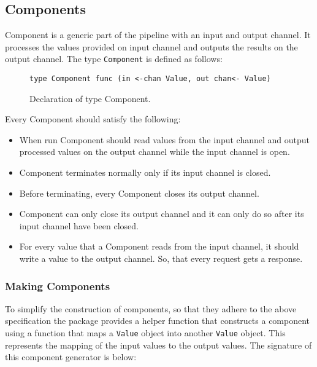 \documentclass[12pt,a4paper]{article}
\begin{document}
\subsection{Components}
Component is a generic part of the pipeline with an input and output channel.
It processes the values provided on input channel and outputs the results
on the output channel. The type \texttt{Component} is defined as follows:


\begin{figure}[h]
\centering
\begin{lstlisting}
type Component func (in <-chan Value, out chan<- Value)
\end{lstlisting}
\caption[scale=1.0]{Declaration of type Component.}
\label{fig:Component}
\end{figure}

Every Component should satisfy the following:
\begin{itemize}
    \item When run Component should read values from the input channel
		  and output processed values on the output channel while the input 
		  channel is open.

    \item Component terminates normally only if its input channel is closed.

    \item Before terminating, every Component closes its output channel.

    \item Component can only close its output channel and it can only do so
    	  after its input channel have been closed.

    \item For every value that a Component reads from the input channel, 
		  it should write a value to the output channel. So, that every request 
		  gets a response.
  
\end{itemize}

\subsubsection{Making Components}
To simplify the construction of components, so that they adhere to 
the above specification the package provides a helper function that 
constructs a component using a function that maps a \texttt{Value} object 
into another \texttt{Value} object. This represents the mapping of the
input values to the output values.
The signature of this component generator is below:
\end{document}
